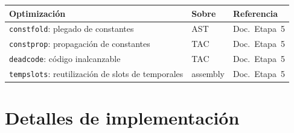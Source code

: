 \documentclass[11pt,a4paper]{article}
\newcommand{\code}[1]{\texttt{#1}}
\begin{document}
\begin{tabularx}{\textwidth}{Lll}
\toprule
\textbf{Optimización} & \textbf{Sobre} & \textbf{Referencia} \\
\midrule
\code{constfold}: plegado de constantes & AST & Doc.\ Etapa~5 \\
\code{constprop}: propagación de constantes & TAC & Doc.\ Etapa~5 \\
\code{deadcode}: código inalcanzable & TAC & Doc.\ Etapa~5 \\
\code{tempslots}: reutilización de slots de temporales & assembly & Doc.\ Etapa~5 \\
\bottomrule
\end{tabularx}

\section{Detalles de implementación}
\end{document}
